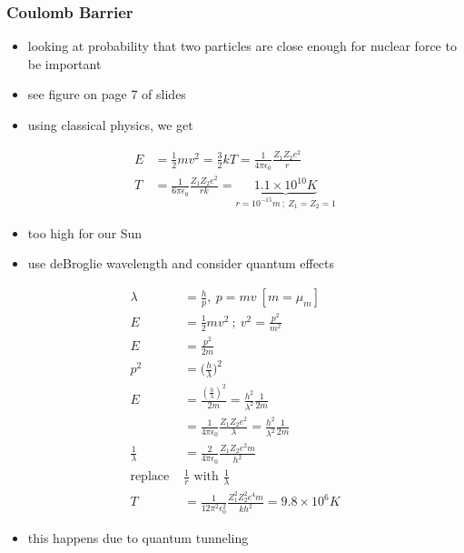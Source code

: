 \documentclass[a4paper,11pt,normalem]{article}
\begin{document}
\subsubsection{Coulomb Barrier}\label{coulomb-barrier}

\begin{itemize}
\item
  looking at probability that two particles are close enough for nuclear
  force to be important
\item
  see figure on page 7 of slides
\item
  using classical physics, we get
\end{itemize}

\[
    \begin{aligned}
    E &= \frac{1}{2}mv^2 = \frac{3}{2}kT = \frac{1}{4\pi\epsilon_0}\frac{Z_1Z_2e^2}{r} \\
    T &= \frac{1}{6\pi\epsilon_0}\frac{Z_1Z_2e^2}{rk} = \underbrace{1.1\times10^{10}K}_{r = 10^{-15}m ~;~ Z_1 = Z_2 = 1}
    \end{aligned}
\]

\begin{itemize}
\item
  too high for our Sun
\item
  use deBroglie wavelength and consider quantum effects
\end{itemize}

\[
    \begin{aligned}
    \lambda &= \frac{h}{p},~ p = mv ~[m = \mu_m] \\
    E &= \frac{1}{2}mv^2 ~;~ v^2 = \frac{p^2}{m^2} \\
    E &= \frac{p^2}{2m} \\
    p^2 &= \Big(\frac{h}{\lambda}\Big)^2 \\
    E &= \frac{(\frac{h}{\lambda})^2}{2m} = \frac{h^2}{\lambda^2}\frac{1}{2m} \\
    &= \frac{1}{4\pi \epsilon_0}\frac{Z_1Z_2e^2}{\lambda} = \frac{h^2}{\lambda^2}\frac{1}{2m} \\
    \frac{1}{\lambda} &= \frac{2}{4\pi\epsilon_0}\frac{Z_1Z_2e^2 m}{h^2} \\
    \text{replace }&\frac{1}{r} \text{ with }\frac{1}{\lambda} \\
    T &= \frac{1}{12\pi^2 \epsilon_{0}^2} \frac{Z_1^2Z_2^2e^4 m}{kh^2} = 9.8\times10^6 K
    \end{aligned}
\]

\begin{itemize}
\item
  this happens due to quantum tunneling
\end{itemize}
\end{document}
